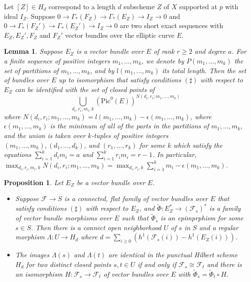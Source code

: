 \documentclass[12pt,oneside,reqno]{amsart}
\newtheorem{lemma}[theorem]{Lemma}
\newtheorem{prop}[theorem]{Proposition}
\theoremstyle{definition}
\begin{document}
Let $[Z] \in H_d$ correspond to a length $d$ subscheme $Z$ of $X$ supported at $p$ with ideal $I_Z$. Suppose $0 \to \Gamma_*(F_Z) \to \Gamma_*(E_Z) \to I_Z \to 0$ and $0 \to \Gamma_*(F_Z') \to \Gamma_*(E_Z') \to I_Z \to 0$ are two short exact sequences with $E_Z, E_Z', F_Z$ and $F_Z'$ vector bundles over the elliptic curve $E$. 

 





\begin{lemma}
Suppose $E_Z$ is a vector bundle over $E$ of rank $r \geq 2$ and degree $a$. For a finite sequence of positive integers $m_1, \dots, m_k$, we denote by $P(m_1, \dots, m_k)$ the set of partitions of $m_1, \dots, m_k$, and by $l(m_1, \dots, m_k)$ its total length. Then the set of bundles over $E$ up to isomorphism that satisfy conditions $(\sharp)$ with respect to $E_Z$ can be identified with the set of closed points of 
\[
\bigcup_{d_i, r_i, m_i, k} (\mathrm{Pic}^0(E))^{N(d_i, r_i; m_1, \dots, m_k)}
\]
where $N(d_i, r_i; m_1, \dots, m_k) = l(m_1, \dots, m_k) - \epsilon(m_1, \dots, m_k)$, where $\epsilon(m_1, \dots, m_k)$ is the minimum of all of the parts in the partitions of $m_1, \dots, m_k$, and the union is taken over $k$-tuples of positive integers $(m_1, \dots, m_k), (d_1, \dots, d_k)$, and $(r_1, \dots, r_k)$ for some $k$ which satisfy the equations $\sum_{i = 1}^k d_i m_i = a$ and $\sum_{i = 1}^k r_i m_i = r - 1$. In particular, $\max_{d_i, r_i, m_i, k} N(d_i, r_i; m_1, \dots, m_k) = \max_{d_i, r_i, k} \sum_{i = 1}^k m_i - \epsilon(m_1, \dots, m_k)$.
\end{lemma}

\begin{prop} Let $E_Z$ be a vector bundle over $E$. 
\begin{itemize}
\item[(1)] Suppose $\mathcal{F} \to S$ is a connected, flat family of vector bundles over $E$ that satisfy conditions $(\sharp)$ with respect to $E_Z$, and $\tilde{\Phi}: E_Z^* \to (\mathcal{F}_s)^*$ is a family of vector bundle morphisms over $E$ such that $\tilde{\Phi}_s$ is an epimprphism for some $s \in S$. Then there is a connect open neighborhood $U$ of $s$ in $S$ and a regular morphism $\Lambda: U \to H_d$ where $d = \sum_{i \geq 0} (h^1(\mathcal{F}_s(i)) - h^1(E_Z(i)))$.
\item[(2)] The images $\Lambda(s)$ and $\Lambda(t)$ are identical in the punctual Hilbert scheme $H_d$ for two distinct closed points $s, t \in U$ if and only if $\mathcal{F}_s \cong \mathcal{F}_t$ and there is an isomorphism $H: \mathcal{F}_s \to \mathcal{F}_t$ of vector bundles over $E$ with $\tilde{\Phi}_s = \tilde{\Phi}_t \circ H$.
\end{itemize}
\end{prop}
\end{document}

